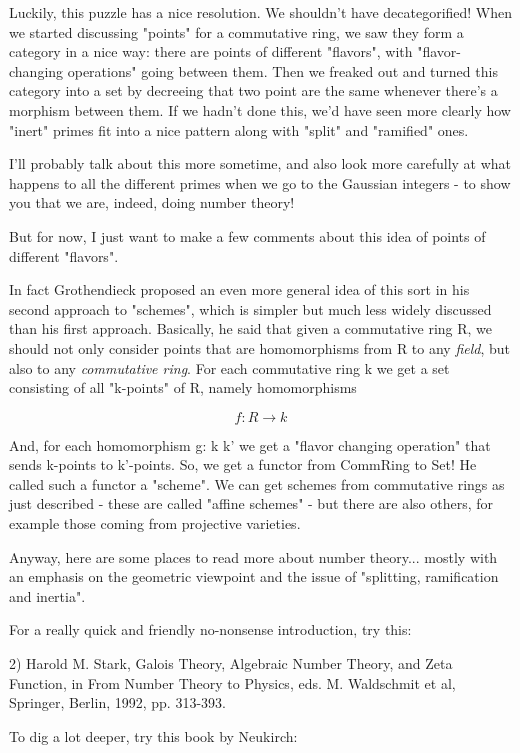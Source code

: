 Luckily, this puzzle has a nice resolution.  We shouldn't have
decategorified!  When we started discussing "points" for a commutative
ring, we saw they form a category in a nice way: there are points of
different "flavors", with "flavor-changing operations" going between
them.  Then we freaked out and turned this category into a set by
decreeing that two point are the same whenever there's a morphism 
between them.  If we hadn't done this, we'd have seen more clearly how 
"inert" primes fit into a nice pattern along with "split" and "ramified" 
ones. 

I'll probably talk about this more sometime, and also look more carefully
at what happens to all the different primes when we go to the Gaussian
integers - to show you that we are, indeed, doing number theory!

But for now, I just want to make a few comments about this idea of 
points of different "flavors".  

In fact Grothendieck proposed an even more general idea of this sort in
his second approach to "schemes", which is simpler but much less widely
discussed than his first approach.  Basically, he said that given a
commutative ring R, we should not only consider points that are  
homomorphisms from R to any \emph{field}, but also to any
\emph{commutative ring}.
For each commutative ring k we get a set consisting of 
all "k-points"
of R, namely homomorphisms 

$$
f: R \to  k
$$
    
And, for each homomorphism g: k \to  k' we get a "flavor changing
operation" that sends k-points to k'-points.  So, we get a functor
from CommRing to Set!  He called such a functor a "scheme".  We can 
get schemes from commutative rings as just described - these are called
"affine schemes" - but there are also others, for example those 
coming from projective varieties.  

Anyway, here are some places to read more about number theory... mostly 
with an emphasis on the geometric viewpoint and the issue of "splitting,
ramification and inertia".

For a really quick and friendly no-nonsense introduction, try this:

2) Harold M. Stark, Galois Theory, Algebraic Number Theory, and Zeta
Function, in From Number Theory to Physics, eds. M. Waldschmit et al, 
Springer, Berlin, 1992, pp. 313-393.

To dig a lot deeper, try this book by Neukirch:

